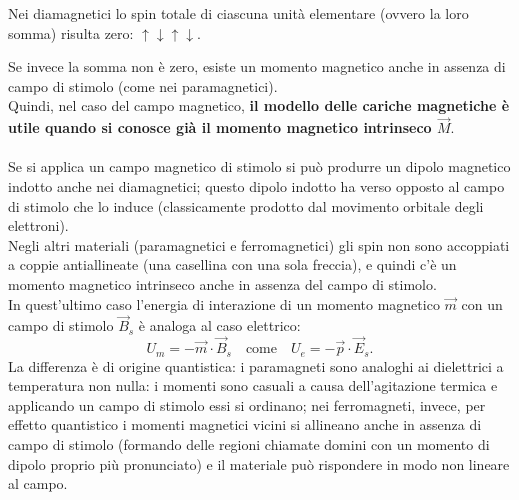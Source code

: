 \documentclass{book}
\begin{document}
Nei diamagnetici lo spin totale di ciascuna unità elementare (ovvero la loro somma) risulta zero: \(\boxed{\uparrow\downarrow}\boxed{\uparrow\downarrow}\).

Se invece la somma non è zero, esiste un momento magnetico anche in assenza di campo di stimolo (come nei paramagnetici). \\
Quindi, nel caso del campo magnetico,\textbf{ il modello delle cariche magnetiche è utile quando si conosce già il momento magnetico intrinseco \(\vec{M}\)}.
\\
\\
Se si applica un campo magnetico di stimolo si può produrre un dipolo magnetico indotto anche nei diamagnetici; questo dipolo indotto ha verso opposto al campo di stimolo che lo induce (classicamente prodotto dal movimento orbitale degli elettroni).
\\
Negli altri materiali (paramagnetici e ferromagnetici) gli spin non sono accoppiati a coppie antiallineate (una casellina con una sola freccia), e quindi c'è un momento magnetico intrinseco anche in assenza del campo di stimolo. \\
In quest'ultimo caso l'energia di interazione di un momento magnetico \(\vec{m}\) con un campo di stimolo \(\vec{B}_s\) è analoga al caso elettrico:
\[
U_m = -\vec{m}\cdot\vec{B}_s \quad\text{come}\quad U_e = -\vec{p}\cdot\vec{E}_s.
\]
La differenza è di origine quantistica:
i paramagneti sono analoghi ai dielettrici a temperatura non nulla: i momenti sono casuali a causa dell'agitazione termica e applicando un campo di stimolo essi si ordinano; nei ferromagneti, invece, per effetto quantistico i momenti magnetici vicini si allineano anche in assenza di campo di stimolo (formando delle regioni chiamate domini con un momento di dipolo proprio più pronunciato) e il materiale può rispondere in modo non lineare al campo.
\\
\\
\end{document}
